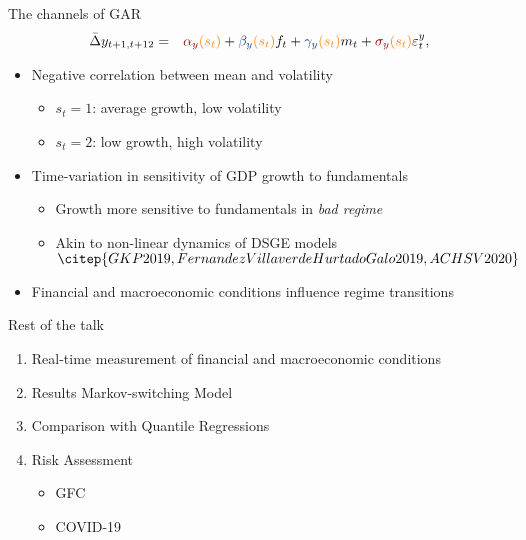\documentclass[xcolor=dvipsnames, xcolor=table, 10pt]{beamer}
\newcommand{\pb}[1]{{\color{fedblue}#1}}
\newcommand{\rr}[1]{{\color{darkred}#1}}
\newcommand{\orr}[1]{{\color{orange}#1}}
\newcommand{\gr}[1]{{\color{darkgreen}#1}}
\begin{document}
\begin{frame}{The channels of GAR}
\vspace*{-0.2in}
\begin{eqnarray*}
\bar{\Delta} {y}_{t+1,t+12} &=& \rr{\alpha_y} \orr{(s_t)} + \pb{\beta_y} \orr{(s_t)} f_t + \pb{\gamma_y} \orr{(s_t)} m_t + \rr{\sigma_y} \orr{(s_t)} \varepsilon^y_t, \label{eq:MS_growth}%
\end{eqnarray*}

\begin{itemize}
\medskip
\item \rr{Negative correlation between mean and volatility}
\begin{itemize}
  \medskip
  \item $s_t=1$: average growth, low volatility
    \medskip
  \item $s_t=2$: low growth, high volatility
\end{itemize}
\bigskip
\item \gr{Time-variation in sensitivity of GDP growth to fundamentals}
\begin{itemize}
   \medskip
   \item Growth more sensitive to fundamentals in \textit{bad regime}
     \medskip
   \item Akin to non-linear dynamics of DSGE models $\citep{GKP2019,FernandezVillaverdeHurtadoGalo2019,ACHSV2020}$
\end{itemize}
\bigskip
\item \orr{Financial and macroeconomic conditions influence regime transitions}
\end{itemize}

\end{frame}


\begin{frame}{Rest of the talk}

\begin{enumerate}
    \item Real-time measurement of financial and macroeconomic conditions
    \bigskip
    \item Results Markov-switching Model
    \bigskip
    \item Comparison with Quantile Regressions
    \bigskip
    \item Risk Assessment
      \begin{itemize}
        \item GFC
         \item COVID-19
      \end{itemize}
\end{enumerate}

\end{frame}
\end{document}
